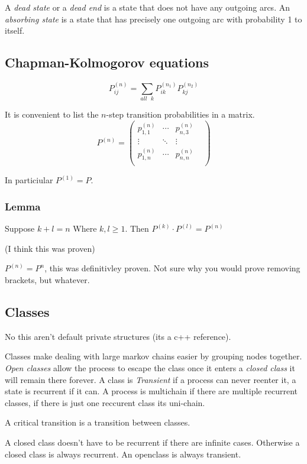 \documentclass{article}
\begin{document}
A \emph{dead state} or a \emph{dead end} is a state that does not have
any outgoing arcs. An \emph{absorbing  state} is a state that has precisely
one outgoing arc with probability 1 to itself.

\subsection{Chapman-Kolmogorov equations}

\[P^{(n)}_{ij} = \sum_{all\mbox{\ }k} P^{(n_1)}_{ik} P^{(n_2)}_{kj} \]

It is convenient to list the $n$-step transition probabilities in a matrix.
\[
	P^{(n)} =
\begin{pmatrix}
	p^{(n)}_{1,1}	& \cdots	& p^{(n)}_{n,3} 	& \\
	\vdots	& \ddots	& \vdots	& \\
	p^{(n)}_{1,n}	& \cdots	& p^{(n)}_{n,n}	& \\
\end{pmatrix}
\]

In particiular $P^{(1)} = P$.

\subsubsection{Lemma}
Suppose $k+l=n$ Where $k,l\ge1$. Then $P^{(k)} \cdot P^{(l)} = P^{(n)}$

(I think this was proven)

$P^{(n)} = P^n$, this was definitivley proven. Not sure why you would
prove removing brackets, but whatever.

\subsection{Classes}
No this aren't default private structures (its a c++ reference).

Classes make dealing with large markov chains easier by grouping nodes
together. \emph{Open classes} allow the process to escape the class once
it enters a \emph{closed class} it will remain there forever.
A class is \emph{Transient} if a process can never reenter it, a
state is recurrent if it can. A process is multichain if there are
multiple recurrent classes, if there is just one reccurent class
its uni-chain.

A critical transition is a transition between classes.

A closed class doesn't have to be recurrent if there are infinite cases.
Otherwise a closed class is always recurrent.
An openclass is always transient.
\end{document}
